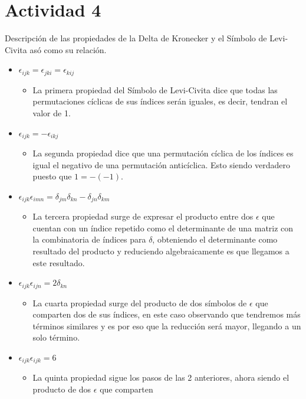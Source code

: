 \documentclass{article}
\begin{document}
\section{Actividad 4}
Descripción de las propiedades de la Delta de Kronecker y el Símbolo de Levi-Civita asó como su relación.
\begin{itemize}
    \item $\epsilon_{ijk}=\epsilon_{jki}=\epsilon_{kij}$
    \begin{itemize}
        \item La primera propiedad del Símbolo de Levi-Civita dice que todas las permutaciones cíclicas 
        de sus índices serán iguales, es decir, tendran el valor de 1.
    \end{itemize}
    \item $\epsilon_{ijk}=-\epsilon_{ikj}$
    \begin{itemize}
        \item La segunda propiedad dice que una permutación cíclica de los índices es igual el negativo 
        de una permutación anticíclica. Esto siendo verdadero puesto que $1=-(-1)$.
    \end{itemize}
    \item $\epsilon_{ijk}\epsilon_{imn}=\delta_{jm}\delta_{kn}-\delta_{jn}\delta_{km}$
    \begin{itemize}
        \item La tercera propiedad surge de expresar el producto entre dos $\epsilon$ que cuentan con un
        índice repetido como el determinante de una matriz con la combinatoria de índices para $\delta$, obteniendo el determinante
        como resultado del producto y reduciendo algebraicamente es que llegamos a este resultado.
    \end{itemize}
    \item $\epsilon_{ijk}\epsilon_{ijn}=2\delta_{kn}$
    \begin{itemize}
        \item La cuarta propiedad surge del producto de dos símbolos de $\epsilon$ que comparten dos de sus índices,
        en este caso observando que tendremos más términos similares y es por eso que la reducción será mayor, llegando
        a un solo término.
    \end{itemize}
    \item $\epsilon_{ijk}\epsilon_{ijk}=6$
    \begin{itemize}
        \item La quinta propiedad sigue los pasos de las 2 anteriores, ahora siendo el producto de dos $\epsilon$ que comparten

\end{itemize}
\end{itemize}
\end{document}

